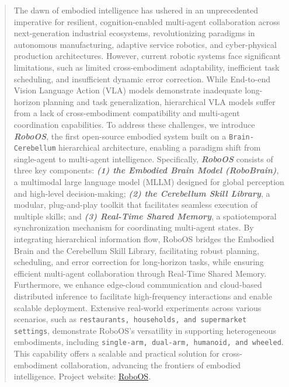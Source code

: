 \begin{abstract}
The dawn of embodied intelligence has ushered in an unprecedented imperative for resilient, cognition-enabled multi-agent collaboration across next-generation industrial ecosystems, revolutionizing paradigms in autonomous manufacturing, adaptive service robotics, and cyber-physical production architectures.
However, current robotic systems face significant limitations, such as limited cross-embodiment adaptability, inefficient task scheduling, and insufficient dynamic error correction.
While End-to-end Vision Language Action (VLA) models demonstrate inadequate long-horizon planning and task generalization, hierarchical VLA models suffer from a lack of cross-embodiment compatibility and multi-agent coordination capabilities.
To address these challenges, we introduce \textit{\textbf{RoboOS}}, the first open-source embodied system built on a \texttt{Brain-Cerebellum} hierarchical architecture, enabling a paradigm shift from single-agent to multi-agent intelligence.
Specifically, \textit{\textbf{RoboOS}} consists of three key components: \textit{\textbf{(1) the Embodied Brain Model (RoboBrain)}}, a multimodal large language model (MLLM) designed for global perception and high-level decision-making; \textit{\textbf{(2) the Cerebellum Skill Library}}, a modular, plug-and-play toolkit that facilitates seamless execution of multiple skills; and \textit{\textbf{(3) Real-Time Shared Memory}}, a spatiotemporal synchronization mechanism for coordinating multi-agent states.
By integrating hierarchical information flow, RoboOS bridges the Embodied Brain and the Cerebellum Skill Library, facilitating robust planning, scheduling, and error correction for long-horizon tasks, while ensuring efficient multi-agent collaboration through Real-Time Shared Memory.
Furthermore, we enhance edge-cloud communication and cloud-based distributed inference to facilitate high-frequency interactions and enable scalable deployment.
Extensive real-world experiments across various scenarios, such as \texttt{restaurants, households, and supermarket settings}, demonstrate RoboOS's versatility in supporting heterogeneous embodiments, including \texttt{single-arm, dual-arm, humanoid, and wheeled}.
This capability offers a scalable and practical solution for cross-embodiment collaboration, advancing the frontiers of embodied intelligence.
Project website: \href{https://github.com/FlagOpen/RoboOS}{RoboOS}.
\end{abstract}

